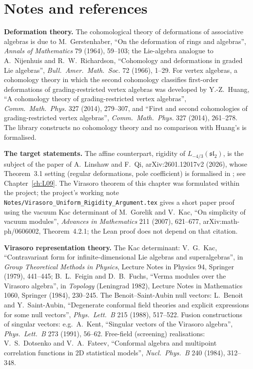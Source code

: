 \section{Notes and references}\label{l07:sec:notes}

\textbf{Deformation theory.} The cohomological theory of deformations of associative algebras is due to
M.~Gerstenhaber, ``On the deformation of rings and algebras'', \emph{Annals of Mathematics} 79 (1964), 59--103;
the Lie-algebra analogue to A.~Nijenhuis and R.~W.~Richardson, ``Cohomology and deformations in graded Lie
algebras'', \emph{Bull.\ Amer.\ Math.\ Soc.} 72 (1966), 1--29. For vertex algebras, a cohomology theory in which
the second cohomology classifies first-order deformations of grading-restricted vertex algebras was developed by
Y.-Z.~Huang, ``A cohomology theory of grading-restricted vertex algebras'', \emph{Comm.\ Math.\ Phys.} 327 (2014),
279--307, and ``First and second cohomologies of grading-restricted vertex algebras'', \emph{Comm.\ Math.\ Phys.}
327 (2014), 261--278. The library constructs no cohomology theory and no comparison with Huang's is formalised.

\textbf{The target statements.} The affine counterpart, rigidity of $L_{-4/3}(\mathfrak{sl}_2)$, is the subject of the
paper of A.~Linshaw and F.~Qi, arXiv:2601.12017v2 (2026), whose Theorem~3.1 setting (regular deformations, pole
coefficient) is formalised in ; see Chapter~\ref{ch:L09}. The
Virasoro theorem of this chapter was formulated within the project; the project's working note
\texttt{Notes/Virasoro\_Uniform\_Rigidity\_Argument.tex} gives a short paper proof using the vacuum Kac
determinant of M.~Gorelik and V.~Kac, ``On simplicity of vacuum modules'', \emph{Advances in Mathematics} 211
(2007), 621--677, arXiv:math-ph/0606002, Theorem~4.2.1; the Lean proof does not depend on that citation.

\textbf{Virasoro representation theory.} The Kac determinant: V.~G.~Kac, ``Contravariant form for
infinite-dimensional Lie algebras and superalgebras'', in \emph{Group Theoretical Methods in Physics}, Lecture
Notes in Physics 94, Springer (1979), 441--445; B.~L.~Feigin and D.~B.~Fuchs, ``Verma modules over the Virasoro
algebra'', in \emph{Topology} (Leningrad 1982), Lecture Notes in Mathematics 1060, Springer (1984), 230--245. The
Benoit--Saint-Aubin null vectors: L.~Benoit and Y.~Saint-Aubin, ``Degenerate conformal field theories and explicit
expressions for some null vectors'', \emph{Phys.\ Lett.\ B} 215 (1988), 517--522. Fusion constructions of singular
vectors: e.g.\ A.~Kent, ``Singular vectors of the Virasoro algebra'', \emph{Phys.\ Lett.\ B} 273 (1991), 56--62. Free-field
(screening) realisations: V.~S.~Dotsenko and V.~A.~Fateev, ``Conformal algebra and multipoint correlation functions
in 2D statistical models'', \emph{Nucl.\ Phys.\ B} 240 (1984), 312--348.

